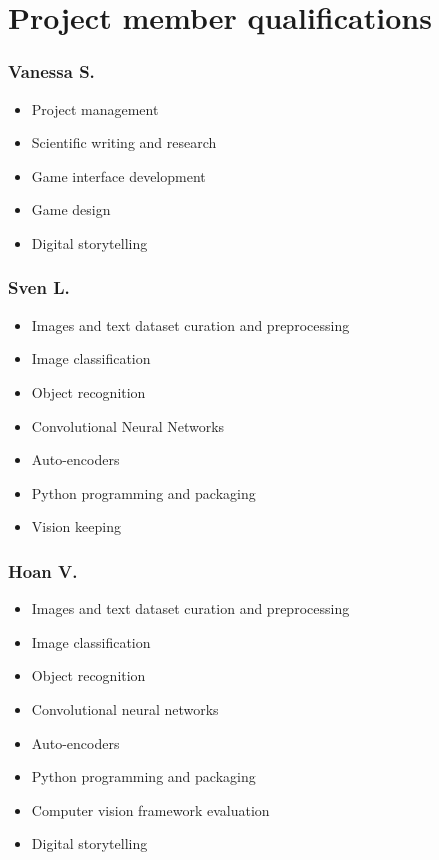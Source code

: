 \section{Project member qualifications}
\subsubsection*{Vanessa S.}
\begin{itemize}
    \item Project management
    \item Scientific writing and research
    \item Game interface development
    \item Game design
    \item Digital storytelling
  \end{itemize}  
\subsubsection*{Sven L.}
\begin{itemize}
    \item Images and text dataset curation and preprocessing
    \item Image classification
    \item Object recognition
    \item Convolutional Neural Networks
    \item Auto-encoders
    \item Python programming and packaging
    \item Vision keeping
  \end{itemize}  
\subsubsection*{Hoan V.}
\begin{itemize}
    \item Images and text dataset curation and preprocessing
    \item Image classification
    \item Object recognition
    \item Convolutional neural networks
    \item Auto-encoders
    \item Python programming and packaging
    \item Computer vision framework evaluation
    \item Digital storytelling
  \end{itemize}  
